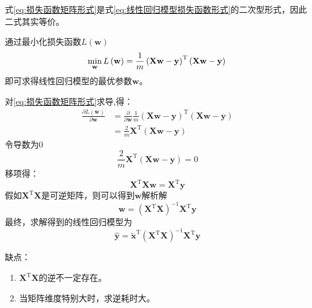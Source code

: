 \documentclass[withoutpreface,bwprint]{NoteBook}
\begin{document}
\begin{tcolorbox}[title={注解：},fonttitle=\bfseries,colframe=green!30!black,colback=green!10!white]
    式\cref{eq:损失函数矩阵形式}是式\cref{eq:线性回归模型损失函数形式}的二次型形式，因此二式其实等价。
\end{tcolorbox}

通过最小化损失函数$L\left ( \mathbf{w} \right )$
\begin{equation}
    \label{eq:最小化损失函数}
    \min_{\mathbf{w}} L\left ( \mathbf{w} \right ) = \frac{1}{m} \left (\mathbf{X} \mathbf{w} -\mathbf{y} \right )^\mathrm{T} \left (\mathbf{X} \mathbf{w} -\mathbf{y} \right ) \\
\end{equation}
即可求得线性回归模型的最优参数$\mathbf{w}$。

对\cref{eq:损失函数矩阵形式}求导,得：
\begin{align}
    \label{eq:损失函数矩阵形式求导}
    \frac{\partial L\left ( \mathbf{w} \right )}{\partial \mathbf{w}}
    &= \frac{\partial}{\partial \mathbf{w}} \frac{1}{m} \left (\mathbf{X} \mathbf{w} -\mathbf{y} \right )^\mathrm{T} \left (\mathbf{X} \mathbf{w} -\mathbf{y} \right ) \nonumber \\
    &= \frac{2}{m} \mathbf{X}^\mathrm{T}  \left (\mathbf{X} \mathbf{w} -\mathbf{y} \right )
\end{align}
令导数为0
\begin{equation}
    \label{eq:令导数为0}
    \frac{2}{m} \mathbf{X}^\mathrm{T}  \left (\mathbf{X} \mathbf{w} -\mathbf{y} \right ) = 0
\end{equation}
移项得：
\begin{equation} 
    \mathbf{X}^\mathrm{T} \mathbf{X} \mathbf{w} =  \mathbf{X}^\mathrm{T} \mathbf{y}
\end{equation}
假如$\mathbf{X}^{\mathrm{T}} \mathbf{X}$是可逆矩阵，则可以得到$\mathbf{w}$解析解
\begin{equation} 
    \mathbf{w} = (\mathbf{X}^\mathrm{T} \mathbf{X})^{-1} \mathbf{X}^\mathrm{T} \mathbf{y}
\end{equation}
最终，求解得到的线性回归模型为
\begin{equation} 
    \label{求解得到的线性回归模型}
    \hat{\mathbf{y}}= \tilde{\mathbf{x}}^\mathrm{T} (\mathbf{X}^\mathrm{T} \mathbf{X})^{-1} \mathbf{X}^\mathrm{T} \mathbf{y}
\end{equation}

缺点：
\begin{enumerate}
    \item $\mathbf{X}^\mathrm{T} \mathbf{X}$的逆不一定存在。
    \item 当矩阵维度特别大时，求逆耗时大。
\end{enumerate}
\end{document}
